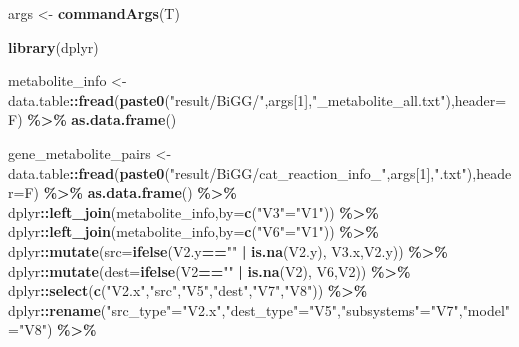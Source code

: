 \documentclass[
]{book}
\newenvironment{Shaded}{\begin{snugshade}}{\end{snugshade}}
\newcommand{\AttributeTok}[1]{\textcolor[rgb]{0.13,0.29,0.53}{#1}}
\newcommand{\DecValTok}[1]{\textcolor[rgb]{0.00,0.00,0.81}{#1}}
\newcommand{\FunctionTok}[1]{\textcolor[rgb]{0.13,0.29,0.53}{\textbf{#1}}}
\newcommand{\NormalTok}[1]{#1}
\newcommand{\OtherTok}[1]{\textcolor[rgb]{0.56,0.35,0.01}{#1}}
\newcommand{\SpecialCharTok}[1]{\textcolor[rgb]{0.81,0.36,0.00}{\textbf{#1}}}
\newcommand{\StringTok}[1]{\textcolor[rgb]{0.31,0.60,0.02}{#1}}
\begin{document}
\begin{Shaded}
\begin{Highlighting}[]
\NormalTok{args }\OtherTok{\textless{}{-}} \FunctionTok{commandArgs}\NormalTok{(T)}

\FunctionTok{library}\NormalTok{(dplyr)}

\NormalTok{metabolite\_info }\OtherTok{\textless{}{-}}\NormalTok{ data.table}\SpecialCharTok{::}\FunctionTok{fread}\NormalTok{(}\FunctionTok{paste0}\NormalTok{(}\StringTok{"result/BiGG/"}\NormalTok{,args[}\DecValTok{1}\NormalTok{],}\StringTok{"\_metabolite\_all.txt"}\NormalTok{),}\AttributeTok{header=}\NormalTok{F) }\SpecialCharTok{\%\textgreater{}\%}
  \FunctionTok{as.data.frame}\NormalTok{()}

\NormalTok{gene\_metabolite\_pairs }\OtherTok{\textless{}{-}}\NormalTok{ data.table}\SpecialCharTok{::}\FunctionTok{fread}\NormalTok{(}\FunctionTok{paste0}\NormalTok{(}\StringTok{"result/BiGG/cat\_reaction\_info\_"}\NormalTok{,args[}\DecValTok{1}\NormalTok{],}\StringTok{".txt"}\NormalTok{),}\AttributeTok{header=}\NormalTok{F) }\SpecialCharTok{\%\textgreater{}\%}
  \FunctionTok{as.data.frame}\NormalTok{() }\SpecialCharTok{\%\textgreater{}\%}
\NormalTok{  dplyr}\SpecialCharTok{::}\FunctionTok{left\_join}\NormalTok{(metabolite\_info,}\AttributeTok{by=}\FunctionTok{c}\NormalTok{(}\StringTok{"V3"}\OtherTok{=}\StringTok{"V1"}\NormalTok{)) }\SpecialCharTok{\%\textgreater{}\%}
\NormalTok{  dplyr}\SpecialCharTok{::}\FunctionTok{left\_join}\NormalTok{(metabolite\_info,}\AttributeTok{by=}\FunctionTok{c}\NormalTok{(}\StringTok{"V6"}\OtherTok{=}\StringTok{"V1"}\NormalTok{)) }\SpecialCharTok{\%\textgreater{}\%}
\NormalTok{  dplyr}\SpecialCharTok{::}\FunctionTok{mutate}\NormalTok{(}\AttributeTok{src=}\FunctionTok{ifelse}\NormalTok{(V2.y}\SpecialCharTok{==}\StringTok{""} \SpecialCharTok{|} \FunctionTok{is.na}\NormalTok{(V2.y),}
\NormalTok{                           V3.x,V2.y)) }\SpecialCharTok{\%\textgreater{}\%}
\NormalTok{  dplyr}\SpecialCharTok{::}\FunctionTok{mutate}\NormalTok{(}\AttributeTok{dest=}\FunctionTok{ifelse}\NormalTok{(V2}\SpecialCharTok{==}\StringTok{""} \SpecialCharTok{|} \FunctionTok{is.na}\NormalTok{(V2),}
\NormalTok{                            V6,V2)) }\SpecialCharTok{\%\textgreater{}\%}
\NormalTok{  dplyr}\SpecialCharTok{::}\FunctionTok{select}\NormalTok{(}\FunctionTok{c}\NormalTok{(}\StringTok{"V2.x"}\NormalTok{,}\StringTok{"src"}\NormalTok{,}\StringTok{"V5"}\NormalTok{,}\StringTok{"dest"}\NormalTok{,}\StringTok{"V7"}\NormalTok{,}\StringTok{"V8"}\NormalTok{)) }\SpecialCharTok{\%\textgreater{}\%}
\NormalTok{  dplyr}\SpecialCharTok{::}\FunctionTok{rename}\NormalTok{(}\StringTok{"src\_type"}\OtherTok{=}\StringTok{"V2.x"}\NormalTok{,}\StringTok{"dest\_type"}\OtherTok{=}\StringTok{"V5"}\NormalTok{,}\StringTok{"subsystems"}\OtherTok{=}\StringTok{"V7"}\NormalTok{,}\StringTok{"model"}\OtherTok{=}\StringTok{"V8"}\NormalTok{) }\SpecialCharTok{\%\textgreater{}\%}

\end{Highlighting}
\end{Shaded}
\end{document}
